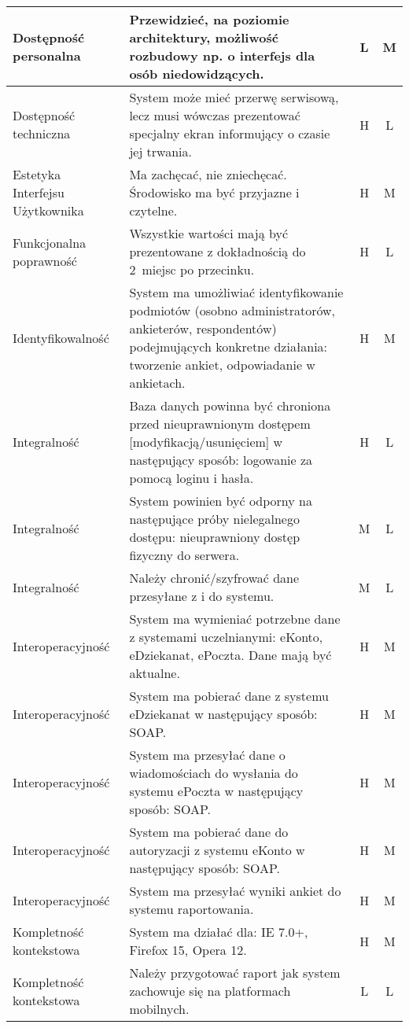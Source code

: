 \begin{center}
\begin{longtable}{ | p{4cm} | p{9cm} | c | c | }
%
Dostępność personalna & Przewidzieć, na poziomie architektury, możliwość rozbudowy np. o interfejs dla osób niedowidzących. & L & M \\ \hline
%
Dostępność techniczna & System może mieć przerwę serwisową, lecz musi wówczas prezentować specjalny ekran informujący o czasie jej trwania. & H & L \\ \hline
%
Estetyka Interfejsu Użytkownika & Ma zachęcać, nie zniechęcać. Środowisko ma być przyjazne i czytelne. & H & M \\ \hline
%
Funkcjonalna poprawność & Wszystkie wartości mają być prezentowane z dokładnością do 2~miejsc po przecinku. & H & L \\ \hline
%
Identyfikowalność & System ma umożliwiać identyfikowanie podmiotów (osobno administratorów, ankieterów, respondentów) podejmujących konkretne działania: tworzenie ankiet, odpowiadanie w 
ankietach. & H & M \\ \hline
%
Integralność & Baza danych powinna być chroniona przed nieuprawnionym dostępem [modyfikacją\slash usunięciem] w następujący sposób: logowanie za pomocą loginu i hasła. & H & L \\ \hline
Integralność & System powinien być odporny na następujące próby nielegalnego dostępu: nieuprawniony dostęp fizyczny do serwera. & M & L \\ \hline
Integralność & Należy chronić\slash szyfrować dane przesyłane z i do systemu. & M & L \\ \hline
%
Interoperacyjność & System ma wymieniać potrzebne dane z systemami uczelnianymi: eKonto, eDziekanat, ePoczta. Dane mają być aktualne. & H & M \\ \hline
Interoperacyjność & System ma pobierać dane z systemu eDziekanat w następujący sposób: SOAP. & H & M \\ \hline
Interoperacyjność & System ma przesyłać dane o wiadomościach do wysłania do systemu ePoczta w następujący sposób: SOAP. & H & M \\ \hline
Interoperacyjność & System ma pobierać dane do autoryzacji z systemu eKonto w następujący sposób: SOAP. & H & M \\ \hline
Interoperacyjność & System ma przesyłać wyniki ankiet do systemu raportowania. & H & M \\ \hline
%
Kompletność kontekstowa & System ma działać dla: IE 7.0+, Firefox 15, Opera 12. & H & M \\ \hline
Kompletność kontekstowa & Należy przygotować raport jak system zachowuje się na platformach mobilnych. & L & L \\ \hline

\end{longtable}
\end{center}
